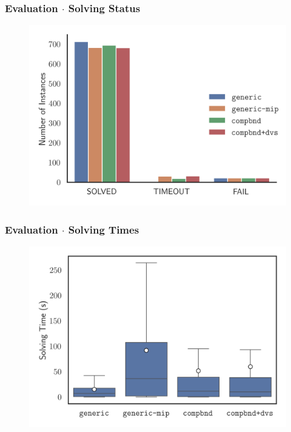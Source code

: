 \documentclass[compress,beamer,aspectratio=169,english,usenames,dvipsnames]{beamer}
\begin{document}
\begin{frame}
\frametitle{Evaluation $\cdot$ Solving Status}
\centering
\begin{figure}
\includegraphics[height=0.85\textheight]{graphics/slides/general/MostFractional/solve_status.png}
\end{figure}
\end{frame}

\begin{frame}
\frametitle{Evaluation $\cdot$ Solving Times}
\centering
\begin{figure}
\includegraphics[height=0.85\textheight]{graphics/slides/general/MostFractional/times.png}
\end{figure}
\end{frame}
\end{document}
